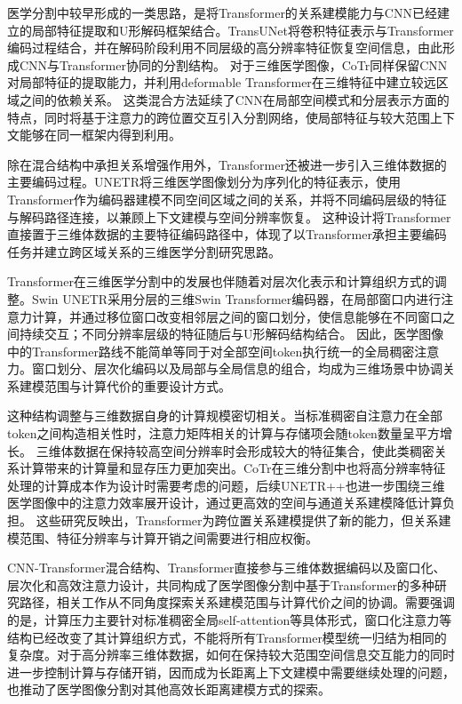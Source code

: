 医学分割中较早形成的一类思路，是将Transformer的关系建模能力与CNN已经建立的局部特征提取和U形解码框架结合。TransUNet将卷积特征表示与Transformer编码过程结合，并在解码阶段利用不同层级的高分辨率特征恢复空间信息，由此形成CNN与Transformer协同的分割结构。\cite{chen2024transunet} 对于三维医学图像，CoTr同样保留CNN对局部特征的提取能力，并利用deformable Transformer在三维特征中建立较远区域之间的依赖关系。\cite{xie2021cotr} 这类混合方法延续了CNN在局部空间模式和分层表示方面的特点，同时将基于注意力的跨位置交互引入分割网络，使局部特征与较大范围上下文能够在同一框架内得到利用。

除在混合结构中承担关系增强作用外，Transformer还被进一步引入三维体数据的主要编码过程。UNETR将三维医学图像划分为序列化的特征表示，使用Transformer作为编码器建模不同空间区域之间的关系，并将不同编码层级的特征与解码路径连接，以兼顾上下文建模与空间分辨率恢复。\cite{hatamizadeh2022unetr} 这种设计将Transformer直接置于三维体数据的主要特征编码路径中，体现了以Transformer承担主要编码任务并建立跨区域关系的三维医学分割研究思路。

Transformer在三维医学分割中的发展也伴随着对层次化表示和计算组织方式的调整。Swin UNETR采用分层的三维Swin Transformer编码器，在局部窗口内进行注意力计算，并通过移位窗口改变相邻层之间的窗口划分，使信息能够在不同窗口之间持续交互；不同分辨率层级的特征随后与U形解码结构结合。\cite{hatamizadeh2022swinunetr} 因此，医学图像中的Transformer路线不能简单等同于对全部空间token执行统一的全局稠密注意力。窗口划分、层次化编码以及局部与全局信息的组合，均成为三维场景中协调关系建模范围与计算代价的重要设计方式。

这种结构调整与三维数据自身的计算规模密切相关。当标准稠密自注意力在全部token之间构造相关性时，注意力矩阵相关的计算与存储项会随token数量呈平方增长。\cite{vaswani2017attention} 三维体数据在保持较高空间分辨率时会形成较大的特征集合，使此类稠密关系计算带来的计算量和显存压力更加突出。CoTr在三维分割中也将高分辨率特征处理的计算成本作为设计时需要考虑的问题，后续UNETR++也进一步围绕三维医学图像中的注意力效率展开设计，通过更高效的空间与通道关系建模降低计算负担。\cite{xie2021cotr,shaker2024unetrpp} 这些研究反映出，Transformer为跨位置关系建模提供了新的能力，但关系建模范围、特征分辨率与计算开销之间需要进行相应权衡。

CNN-Transformer混合结构、Transformer直接参与三维体数据编码以及窗口化、层次化和高效注意力设计，共同构成了医学图像分割中基于Transformer的多种研究路径，相关工作从不同角度探索关系建模范围与计算代价之间的协调。需要强调的是，计算压力主要针对标准稠密全局self-attention等具体形式，窗口化注意力等结构已经改变了其计算组织方式，不能将所有Transformer模型统一归结为相同的复杂度。对于高分辨率三维体数据，如何在保持较大范围空间信息交互能力的同时进一步控制计算与存储开销，因而成为长距离上下文建模中需要继续处理的问题，也推动了医学图像分割对其他高效长距离建模方式的探索。

